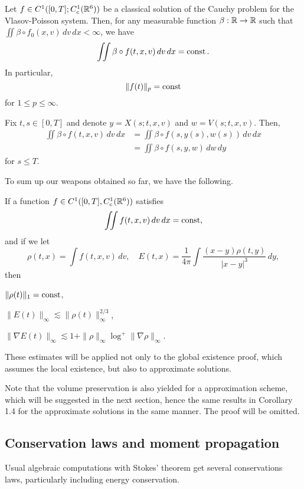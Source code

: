 \documentclass{article}
\begin{document}
\begin{cor}
Let $f\in C^1([0,T];C_c^1(\mathbb{R}^6))$ be a classical solution of the Cauchy problem for the Vlasov-Poisson system.
Then, for any measurable function $\beta:\mathbb{R}\to\mathbb{R}$ such that $\iint\beta\circ f_0(x,v)\,dv\,dx<\infty$, we have
\[\iint\beta\circ f(t,x,v)\,dv\,dx=\operatorname{const}.\]
In particular,
\[\|f(t)\|_p=\operatorname{const}\]
for $1\le p\le\infty$.
\end{cor}
\begin{pf}
Fix $t,s\in[0,T]$ and denote $y=X(s;t,x,v)$ and $w=V(s;t,x,v)$.
Then,
\begin{align*}
\iint\beta\circ f(t,x,v)\,dv\,dx
&=\iint\beta\circ f(s,y(s),w(s))\,dv\,dx\\
&=\iint\beta\circ f(s,y,w)\,dw\,dy
\end{align*}
for $s\le T$.
\end{pf}

To sum up our weapons obtained so far, we have the following.
\begin{cor}
If a function $f\in C^1([0,T],C_c^1(\mathbb{R}^6))$ satisfies
\[\iint f(t,x,v)\,dv\,dx=\operatorname{const},\]
and if we let
\[\rho(t,x)=\int f(t,x,v)\,dv,\quad E(t,x)=\frac1{4\pi}\int\frac{(x-y)\rho(t,y)}{|x-y|^3}\,dy,\]
then
\begin{parts}
\item $\|\rho(t)\|_1=\operatorname{const}$,
\item $\|E(t)\|_\infty\lesssim\|\rho(t)\|_\infty^{2/3}$,
\item $\|\nabla E(t)\|_\infty\lesssim1+\|\rho\|_\infty\log^+\|\nabla\rho\|_\infty$.
\end{parts}
\end{cor}
These estimates will be applied not only to the global existence proof, which assumes the local existence, but also to approximate solutions.

\begin{rmk}
Note that the volume preservation is also yielded for a approximation scheme, which will be suggested in the next section, hence the same results in Corollary 1.4 for the approximate solutions in the same manner.
The proof will be omitted.
\end{rmk}


\subsection{Conservation laws and moment propagation}
Usual algebraic computations with Stokes' theorem get several conservations laws, particularly including energy conservation.
\end{document}

